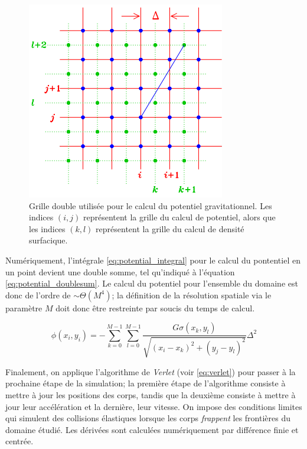 \documentclass{article}
\begin{document}
\begin{figure}[H]
	\centering
	\hspace{-1cm}
	\includegraphics[scale=0.7]{images/doublegrid.PNG}
	\caption{Grille double utilisée pour le calcul du potentiel gravitationnel. Les indices $(i, j)$ représentent la grille du calcul de potentiel, alors que les indices $(k, l)$ représentent la grille du calcul de densité surfacique. \cite{notes_cours}}
	\label{fig:double_grille}
\end{figure}

Numériquement, l'intégrale \ref{eq:potential_integral} pour le calcul du pontentiel en un point devient une double somme, tel qu'indiqué à l'équation \ref{eq:potential_doublesum}. Le calcul du potentiel pour l'ensemble du domaine est donc de l'ordre de $\sim \Theta (M^4)$; la définition de la résolution spatiale via le paramètre $M$ doit donc être restreinte par soucis du temps de calcul. 

\begin{equation}\label{eq:potential_doublesum}
\phi(x_i, y_i) = - \sum_{k=0}^{M-1} \sum_{l=0}^{M-1} \frac{G \sigma (x_k, y_l)}{\sqrt{(x_i-x_k)^2+(y_j-y_l)^2}} \Delta^2
\end{equation}

Finalement, on applique l'algorithme de \textit{Verlet} (voir \ref{eq:verlet}) pour passer à la prochaine étape de la simulation; la première étape de l'algorithme consiste à mettre à jour les positions des corps, tandis que la deuxième consiste à mettre à jour leur accélération et la dernière, leur vitesse. On impose des conditions limites qui simulent des collisions élastiques lorsque les corps \textit{frappent} les frontières du domaine étudié. Les dérivées sont calculées numériquement par différence finie et centrée.
\end{document}
